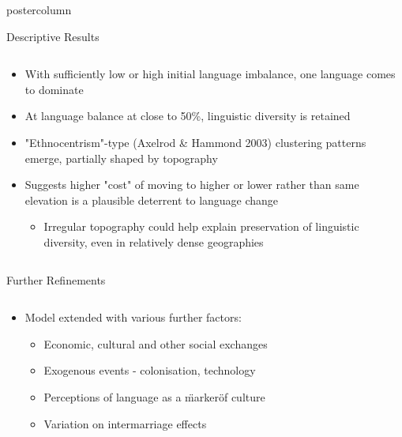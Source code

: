 \documentclass[final,hyperref={pdfpagelabels=false}]{beamer}
\begin{document}
\begin{frame}
\begin{columns}
\begin{column}{.33\textwidth}
\begin{beamercolorbox}[center,wd=\textwidth]{postercolumn}
\begin{minipage}[T]{.95\textwidth}
{\begin{block}{Descriptive Results}
              \begin{columns}
                \begin{column}{.99\textwidth}
                  \begin{itemize}
                    \item With sufficiently low or high initial language imbalance, one language comes to dominate
                    \item At language balance at close to 50\%, linguistic diversity is retained
                    \item "Ethnocentrism"-type (Axelrod \& Hammond 2003) clustering patterns emerge, partially shaped by topography
                    \item Suggests higher "cost" of moving to higher or lower rather than same elevation is a plausible deterrent to
                      language change
                      \begin{itemize}
                        \item Irregular topography could help explain preservation of linguistic diversity, even in relatively dense geographies
                      \end{itemize}
                  \end{itemize}
                \end{column}
              \end{columns}
            \end{block}
            \vfill
            \begin{block}{Further Refinements}
              \begin{columns}
                \begin{column}{.99\textwidth}
                  \begin{itemize}
                    \item Model extended with various further factors:
                      \begin{itemize}
                        \item Economic, cultural and other social exchanges
                        \item Exogenous events - colonisation, technology
                        \item Perceptions of language as a \"marker\" of culture
                        \item Variation on intermarriage effects
                      \end{itemize}
                  \end{itemize}

\end{column}
\end{columns}
\end{block}}
\end{minipage}
\end{beamercolorbox}
\end{column}
\end{columns}
\end{frame}
\end{document}
